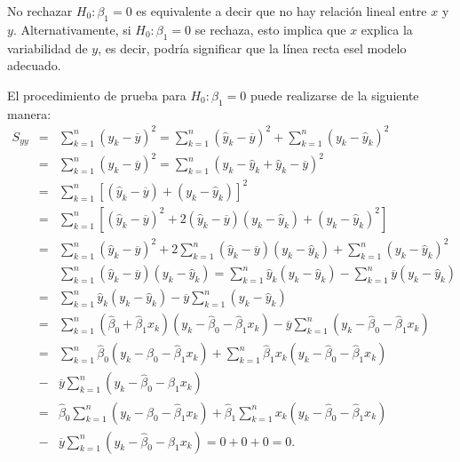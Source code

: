 \begin{itemize}
\begin{enumerate}
No rechazar $H_{0}:\beta_{1}=0$ es equivalente a decir que no hay relaci\'on lineal entre $x$ y $y$.  Alternativamente, si $H_{0}:\beta_{1}=0$ se rechaza, esto implica que $x$ explica la variabilidad de $y$, es decir, podr\'ia significar que la l\'inea recta esel modelo adecuado.

El procedimiento de prueba para $H_{0}:\beta_{1}=0$ puede realizarse de la siguiente manera:
\begin{eqnarray*}
S_{yy}&=&\sum_{k=1}^{n}\left(y_{k}-\overline{y}\right)^{2}=\sum_{k=1}^{n}\left(\hat{y}_{k}-\overline{y}\right)^{2}+\sum_{k=1}^{n}\left(y_{k}-\hat{y}_{k}\right)^{2}\\
&=&\sum_{k=1}^{n}\left(y_{k}-\overline{y}\right)^{2}=\sum_{k=1}^{n}\left(y_{k}-\hat{y}_{k}+\hat{y}_{k}-\overline{y}\right)^{2}\\
&=&\sum_{k=1}^{n}\left[\left(\hat{y}_{k}-\overline{y}\right)+\left(y_{k}-\hat{y}_{k}\right)\right]^{2}\\
&=&\sum_{k=1}^{n}\left[\left(\hat{y}_{k}-\overline{y}\right)^{2}+2\left(\hat{y}_{k}-\overline{y}\right)\left(y_{k}-\hat{y}_{k}\right)+\left(y_{k}-\hat{y}_{k}\right)^{2}\right]\\
&=&\sum_{k=1}^{n}\left(\hat{y}_{k}-\overline{y}\right)^{2}+2\sum_{k=1}^{n}\left(\hat{y}_{k}-\overline{y}\right)\left(y_{k}-\hat{y}_{k}\right)+\sum_{k=1}^{n}\left(y_{k}-\hat{y}_{k}\right)^{2}\\
&&\sum_{k=1}^{n}\left(\hat{y}_{k}-\overline{y}\right)\left(y_{k}-\hat{y}_{k}\right)=\sum_{k=1}^{n}\hat{y}_{k}\left(y_{k}-\hat{y}_{k}\right)-\sum_{k=1}^{n}\overline{y}\left(y_{k}-\hat{y}_{k}\right)\\
&=&\sum_{k=1}^{n}\hat{y}_{k}\left(y_{k}-\hat{y}_{k}\right)-\overline{y}\sum_{k=1}^{n}\left(y_{k}-\hat{y}_{k}\right)\\
&=&\sum_{k=1}^{n}\left(\hat{\beta}_{0}+\hat{\beta}_{1}x_{k}\right)\left(y_{k}-\hat{\beta}_{0}-\hat{\beta}_{1}x_{k}\right)-\overline{y}\sum_{k=1}^{n}\left(y_{k}-\hat{\beta}_{0}-\hat{\beta}_{1}x_{k}\right)\\
&=&\sum_{k=1}^{n}\hat{\beta}_{0}\left(y_{k}-\hat{\beta}_{0}-\hat{\beta}_{1}x_{k}\right)+\sum_{k=1}^{n}\hat{\beta}_{1}x_{k}\left(y_{k}-\hat{\beta}_{0}-\hat{\beta}_{1}x_{k}\right)\\
&-&\overline{y}\sum_{k=1}^{n}\left(y_{k}-\hat{\beta}_{0}-\hat{\beta}_{1}x_{k}\right)\\
&=&\hat{\beta}_{0}\sum_{k=1}^{n}\left(y_{k}-\hat{\beta}_{0}-\hat{\beta}_{1}x_{k}\right)+\hat{\beta}_{1}\sum_{k=1}^{n}x_{k}\left(y_{k}-\hat{\beta}_{0}-\hat{\beta}_{1}x_{k}\right)\\
&-&\overline{y}\sum_{k=1}^{n}\left(y_{k}-\hat{\beta}_{0}-\hat{\beta}_{1}x_{k}\right)=0+0+0=0.
\end{eqnarray*}


\end{enumerate}
\end{itemize}
